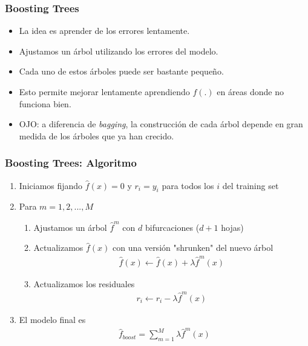 \documentclass[
  shownotes,
  xcolor={svgnames},
  hyperref={colorlinks,citecolor=DarkBlue,linkcolor=andesred,urlcolor=DarkBlue}
  , aspectratio=169]{beamer}
\begin{document}
\begin{frame}[fragile]
\frametitle{Boosting Trees}


\begin{itemize}
  \item La idea es aprender de los errores lentamente. 
  \medskip
  \item Ajustamos un árbol utilizando los errores del modelo. 
  \medskip
  \item Cada uno de estos árboles puede ser bastante pequeño. 
  \medskip
  \item Esto permite mejorar lentamente aprendiendo $f(.)$ en áreas donde no funciona bien.
  \medskip
  \item OJO: a diferencia de {\it bagging}, la construcción de cada árbol depende en gran medida de los árboles que ya han crecido.
\end{itemize} 
\end{frame}
\begin{frame}[fragile]
\frametitle{Boosting Trees: Algoritmo}

\begin{enumerate}
\item Iniciamos fijando $\hat{f}(x)=0$ y $r_i=y_i$ para todos los $i$ del training set
\medskip
\item Para $m=1,2,...,M$
\begin{enumerate}
  \item Ajustamos un árbol $\hat{f}^m$ con $d$ bifurcaciones ($d+1$ hojas)
  \medskip 
  \item Actualizamos $\hat{f}(x)$ con una versión "shrunken" del nuevo árbol
  \begin{align}
  \hat{f}(x)\leftarrow \hat{f}(x)+\lambda\hat{f}^m(x)
  \end{align}
  \medskip 
  \item Actualizamos los residuales
  \begin{align}
  r_i\leftarrow r_i-\lambda\hat{f}^m(x)
  \end{align}
  \medskip
\end{enumerate}
  \item El modelo final es
  \begin{align}
  \hat{f}_{boost} =\sum_{m=1}^M \lambda \hat{f}^m(x)
  \end{align}
  
\end{enumerate}
\end{frame}
\end{document}
